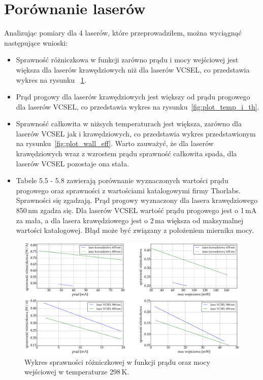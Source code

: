 \section{Porównanie laserów}
Analizując pomiary dla 4 laserów, które przeprowadziłem, można wyciągnąć następujące wnioski:
\begin{itemize}
\item Sprawność różniczkowa w funkcji zarówno prądu i mocy wejściowej jest większa dla laserów krawędziowych niż dla laserów
VCSEL, co przedstawia wykres na rysunku ~\ref{fig:plot_eff}.
\item Prąd progowy dla laserów krawędziowych jest większy od prądu progowego dla laserów VCSEL, co przedstawia wykres
na rysunku~\ref{fig:plot_temp_i_th}.
\item Sprawność całkowita w niżsych temperaturach jest większa, zarówno dla laserów VCSEL jak i krawędziowych, co przedstawia
wykres przedstawionym na rysunku~\ref{fig:plot_wall_eff}. Warto zauważyć, że dla laserów krawędziowych wraz z wzrostem prądu
sprawność całkowita spada, dla laserów VCSEL pozostaje ona stała.
\item Tabele 5.5 - 5.8 zawierają porównanie wyznaczonych wartości prądu progowego oraz sprawności z wartościami katalogowymi
firmy Thorlabs. Sprawności się zgadzają. Prąd progowy wyznaczony dla lasera krawędziowego 850\,nm zgadza się. Dla laserów VCSEL
wartość prądu progowego jest o 1\,mA za mała, a dla lasera krawędziowego jest o 2\,ma większa od maksymalnej wartości katalogowej.
 Błąd może być związany z położeniem miernika mocy.
\end{itemize}
\begin{figure}[H]
\center
  \includegraphics[scale=0.30]{plot_common/plot_eff.eps}
  \caption{Wykres sprawności różniczkowej w funkcji prądu oraz mocy wejściowej w temperaturze 298\,K.}
  \label{fig:plot_eff}
\end{figure}

